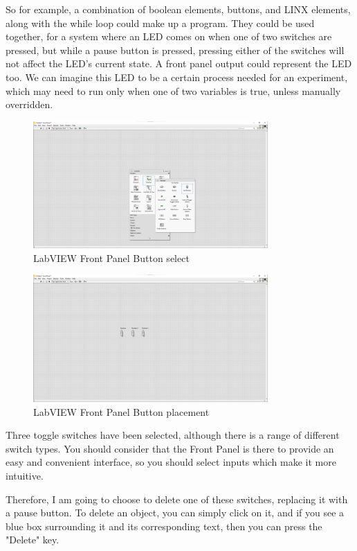 \documentclass[a4paper,11pt]{report}
\begin{document}
So for example, a combination of boolean elements, buttons, and LINX elements, along with the while loop could make up a program. They could be used together, for a system where an LED comes on when one of two switches are pressed, but while a pause button is pressed, pressing either of the switches will not affect the LED's current state. A front panel output could represent the LED too. We can imagine this LED to be a certain process needed for an experiment, which may need to run only when one of two variables is true, unless manually overridden.

\begin{figure}[H]
\centering
\includegraphics[width=0.8\textwidth]{screenshots/labview10}
\caption{LabVIEW Front Panel Button select}
\end{figure}

\begin{figure}[H]
\centering
\includegraphics[width=0.8\textwidth]{screenshots/labview11}
\caption{LabVIEW Front Panel Button placement}
\end{figure}

Three toggle switches have been selected, although there is a range of different switch types. You should consider that the Front Panel is there to provide an easy and convenient interface, so you should select inputs which make it more intuitive.

Therefore, I am going to choose to delete one of these switches, replacing it with a pause button. To delete an object, you can simply click on it, and if you see a blue box surrounding it and its corresponding text, then you can press the "Delete" key.
\end{document}
